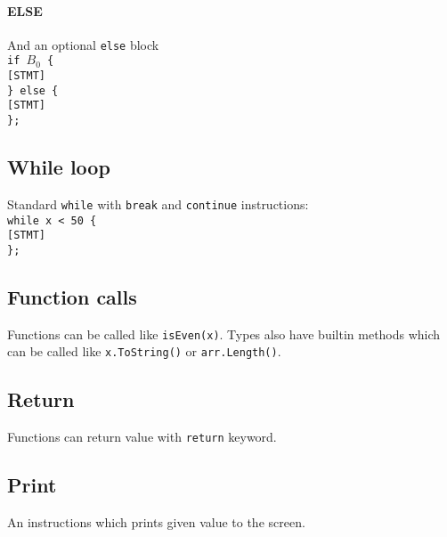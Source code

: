 \documentclass{article}
\begin{document}
\paragraph{ELSE}
And an optional \texttt{else} block \\
\texttt{if $B_0$ \{ \\
  \hspace*{2em} [STMT] \\
\} else \{ \\
  \hspace*{2em} [STMT] \\
\};}

\subsection{While loop}
Standard \texttt{while} with \texttt{break} and \texttt{continue} instructions: \\
\texttt{while x < 50 \{ \\
  \hspace*{2em} [STMT] \\
\};}

\subsection{Function calls}
Functions can be called like \texttt{isEven(x)}. Types also have builtin
methods which can be called like \texttt{x.ToString()} or \texttt{arr.Length()}.

\subsection{Return}
Functions can return value with \texttt{return} keyword.

\subsection{Print}
An instructions which prints given value to the screen.
\end{document}
